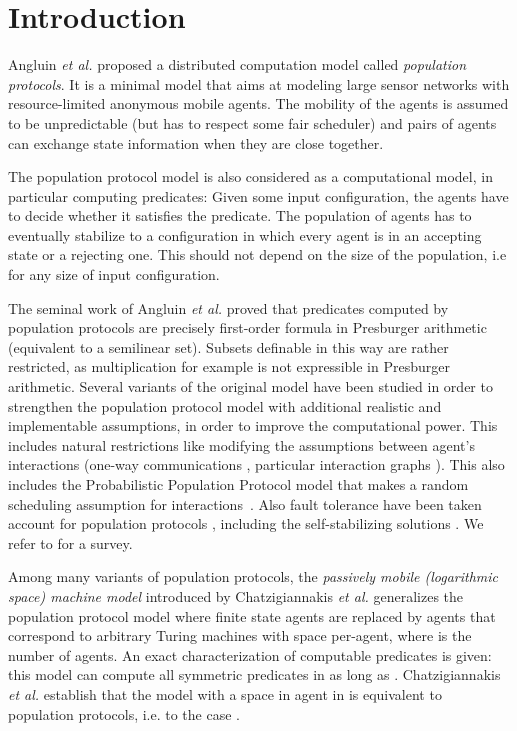 \documentclass[UKenglish]{llncs}
\begin{document}
\section{Introduction}



Angluin \emph{et al.}  \cite{AspnesADFP2004} proposed a  
distributed computation model called {\em population protocols}. It is a minimal model that aims at modeling large
sensor networks with resource-limited anonymous mobile agents. The
mobility of the agents is assumed to be unpredictable (but has to respect some
fair scheduler) and pairs of agents can
exchange state information when they are close
together.  

The population protocol model is also considered as a computational model, in
particular computing predicates: Given some input configuration, the
agents have to decide whether it satisfies the predicate.
The population of agents has to eventually stabilize to a
configuration in which every agent is in an accepting state or a
rejecting one. This should not depend on the size of the population,
i.e for any
size of input configuration. 

The seminal work of Angluin \emph{et
al.} \cite{angluin2007cpp,AspnesADFP2004} proved that predicates
computed by population protocols are precisely first-order formula in Presburger arithmetic
(equivalent to a semilinear set).  Subsets definable
in this way are rather restricted, as multiplication for example is not
expressible in Presburger
arithmetic. 
Several variants
of the original model have been 
studied in order to strengthen the population protocol model with
additional realistic and implementable assumptions, in order to improve the
computational power. This includes natural restrictions like modifying the assumptions between
agent's interactions (one-way communications \cite{angluin2007cpp},
particular interaction graphs \cite{AngluinACFJP2005}).  This also
includes the 
Probabilistic Population Protocol model that makes a random scheduling
assumption for interactions~\cite{AspnesADFP2004}.  Also fault tolerance have been taken account  for population protocols
\cite{Delporte-GalletFGR06}, including the self-stabilizing
solutions \cite{OPODIS}.  We refer to
\cite{PopProtocolsEATCS,ChatzigiannakisMS10} for a 
survey.



Among many variants of population protocols, the \emph{passively mobile
(logarithmic space) machine model} introduced by Chatzigiannakis \emph{et
  al.}  \cite{chatzigiannakis2011passively} generalizes  the population protocol model where finite state
agents are replaced by agents that correspond to arbitrary Turing
machines with  space per-agent, where  is the number
of agents.  An exact characterization
\cite{chatzigiannakis2011passively} of computable predicates is given: this model can compute all symmetric predicates in 
as long as .  Chatzigiannakis \emph{et al.}
establish that  the
model with a space in agent in   is equivalent to population protocols, i.e. to the case
. 
\end{document}
